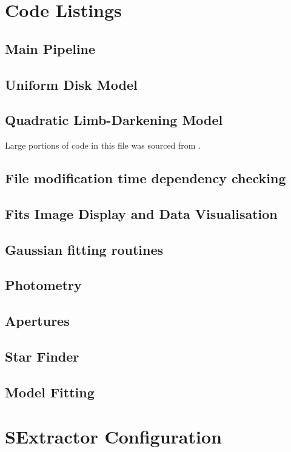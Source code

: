 
\providecommand{\pycode}[3]{
  \subsection{#1}
  
}

\providecommand{\configfile}[1]{
  
}
\section{Code Listings}

\pycode{Main Pipeline}{../pipeline.py}{pipeline.py}
\pycode{Uniform Disk Model}{../model/uniform_disk.py}{model/uniform\_disk.py}
\pycode{Quadratic Limb-Darkening Model}{../model/quad_limb.py}{model/quad\_limb.py}
Large portions of code in this file was sourced from \citep{mandel2002analytic}.
\pycode{File modification time dependency checking}{../common/dependency.py}{common/dependency.py}
\pycode{Fits Image Display and Data Visualisation}{../common/display.py}{common/display.py}
\pycode{Gaussian fitting routines}{../common/gaussian.py}{common/gaussian.py}
\pycode{Photometry}{../photometry/photometry.py}{photometry/photometry.py}
\pycode{Apertures}{../photometry/aperture.py}{photometry/aperture.py}
\pycode{Star Finder}{../photometry/finder.py}{photometry/finder.py}
\pycode{Model Fitting}{../model/fitting.py}{model/fitting.py}

\section{SExtractor Configuration}

\configfile{../config.sex}
